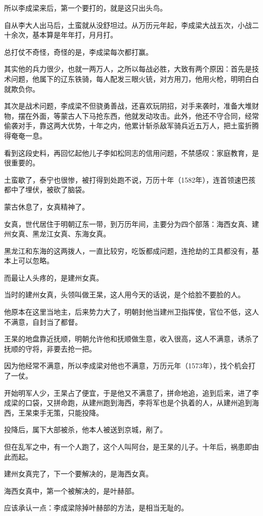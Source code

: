 \begin{multicols}{\theparacolNo}
所以李成梁来后，第一个要打的，就是这只出头鸟。

自从李大人出马后，土蛮就从没舒坦过。从万历元年起，李成梁大战五次，小战二十余次，基本算是年年打，月月打。

总打仗不奇怪，奇怪的是，李成梁每次都打赢。

其实他的兵力很少，也就一两万人，之所以每战必胜，大致有两个原因：首先是技术问题，他属下的辽东铁骑，每人配发三眼火铳，对方用刀，他用火枪，明明白白就欺负你。

其次是战术问题，李成梁不但骁勇善战，还喜欢玩阴招，对手来袭时，准备大堆财物，摆在外面，等蒙古人下马抢东西，他就发动攻击。此外，他还不守合同，经常偷袭对手，靠这两大优势，十年之内，他累计斩杀敌军骑兵近五万人，把土蛮折腾得奄奄一息。

看到这段史料，再回忆起他儿子李如松同志的信用问题，不禁感叹：家庭教育，是很重要的。

土蛮歇了，泰宁也很惨，被打得到处跑不说，万历十年（1582年），连首领速巴孩都中了埋伏，被砍了脑袋。

蒙古休息了，女真精神了。

女真，世代居住于明朝辽东一带，到万历年间，主要分为四个部落：海西女真、建州女真、黑龙江女真、东海女真。

黑龙江和东海的这两拨人，一直比较穷，吃饭都成问题，连抢劫的工具都没有，基本上可以忽略。

而最让人头疼的，是建州女真。

当时的建州女真，头领叫做王杲，这人用今天的话说，是个给脸不要脸的人。

他原本在这里当地主，后来势力大了，明朝封他当建州卫指挥使，官位不低，这人不满意，自封当了都督。

王杲的地盘靠近抚顺，明朝允许他和抚顺做生意，收入很高，这人不满意，诱杀了抚顺的守将，非要去抢一把。

因为他经常不满意，所以李成梁对他也不满意，万历元年（1573年），找个机会打了一仗。

开始明军人少，王杲占了便宜，于是他又不满意了，拼命地追，追到后来，进了李成梁的口袋，又拼命跑，从建州跑到海西，李将军也是个执着的人，从建州追到海西，王杲束手无策，只能投降。

投降后，属下大部被杀，他本人被送到京城，剐了。

但在乱军之中，有一个人跑了，这个人叫阿台，是王杲的儿子。十年后，祸患即由此而起。

建州女真完了，下一个要解决的，是海西女真。

海西女真中，第一个被解决的，是叶赫部。

应该承认一点：李成梁除掉叶赫部的方法，是相当无耻的。


\end{multicols}
